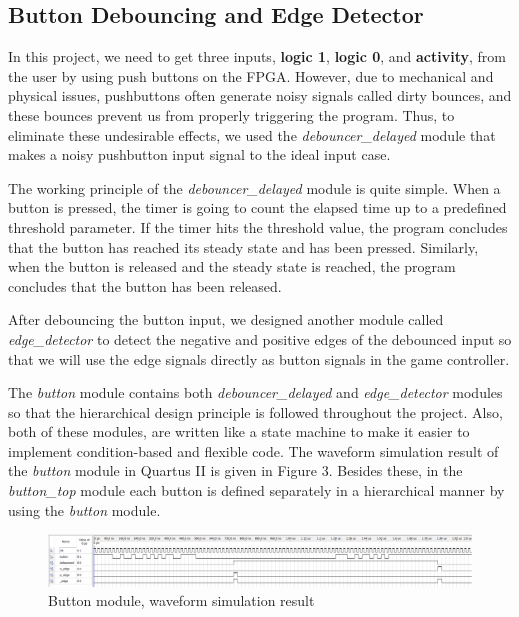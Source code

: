 \documentclass[conference]{IEEEtran}
\begin{document}
\subsection{Button Debouncing and Edge Detector}
In this project, we need to get three inputs, \textbf{logic 1}, \textbf{logic 0}, and \textbf{activity}, from the user by using push buttons on the FPGA. However, due to mechanical and physical issues, pushbuttons often generate noisy signals called dirty bounces, and these bounces prevent us from properly triggering the program. Thus, to eliminate these undesirable effects, we used the \textit{debouncer\_delayed} module that makes a noisy pushbutton input signal to the ideal input case. \\
\par The working principle of the \textit{debouncer\_delayed} module is quite simple. When a button is pressed, the timer is going to count the elapsed time up to a predefined threshold parameter. If the timer hits the threshold value, the program concludes that the button has reached its steady state and has been pressed. Similarly, when the button is released and the steady state is reached, the program concludes that the button has been released. \\
\par After debouncing the button input, we designed another module called \textit{edge\_detector} to detect the negative and positive edges of the debounced input so that we will use the edge signals directly as button signals in the game controller. \\
\par The \textit{button} module contains both \textit{debouncer\_delayed} and \textit{edge\_detector} modules so that the hierarchical design principle is followed throughout the project. Also, both of these modules, are written like a state machine to make it easier to implement condition-based and flexible code. The waveform simulation result of the \textit{button} module in Quartus II is given in Figure 3. Besides these, in the \textit{button\_top} module each button is defined separately in a hierarchical manner by using the \textit{button} module.
 \begin{figure}[H]
   \centerline{\includegraphics[scale=0.22]{simulation.png}}
    \caption{Button module, waveform simulation result}
\end{figure} 
\end{document}
